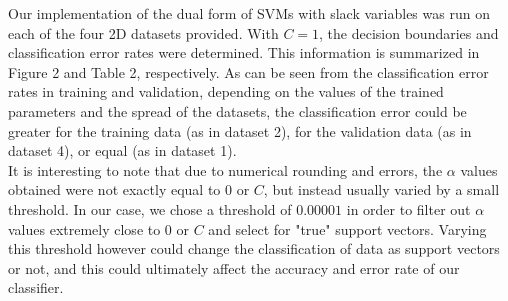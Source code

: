 \documentclass{article}
\begin{document}
Our implementation of the dual form of SVMs with slack variables was run on each of the four 2D datasets provided. With $C=1$, the decision boundaries and classification error rates were determined. This information is summarized in Figure 2 and Table 2, respectively. As can be seen from the classification error rates in training and validation, depending on the values of the trained parameters and the spread of the datasets, the classification error could be greater for the training data (as in dataset 2), for the validation data (as in dataset 4), or equal (as in dataset 1). \\

It is interesting to note that due to numerical rounding and errors, the $\alpha$ values obtained were not exactly equal to 0 or $C$, but instead usually varied by a small threshold. In our case, we chose a threshold of $0.00001$ in order to filter out $\alpha$ values extremely close to 0 or $C$ and select for "true" support vectors. Varying this threshold however could change the classification of data as support vectors or not, and this could ultimately affect the accuracy and error rate of our classifier.
\end{document}

